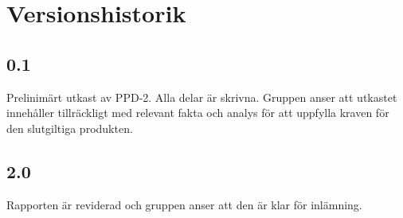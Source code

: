 \section*{Versionshistorik}

\subsection*{0.1}
Prelinimärt utkast av PPD-2. Alla delar är skrivna. Gruppen anser att utkastet innehåller tillräckligt med relevant fakta och analys för att uppfylla kraven för den slutgiltiga produkten.

\subsection*{2.0}
Rapporten är reviderad och gruppen anser att den är klar för inlämning.